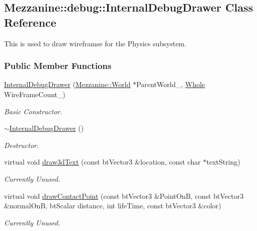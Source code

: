 \hypertarget{classMezzanine_1_1debug_1_1InternalDebugDrawer}{
\subsection{Mezzanine::debug::InternalDebugDrawer Class Reference}
\label{classMezzanine_1_1debug_1_1InternalDebugDrawer}
}


This is used to draw wireframse for the Physics subsystem.  


\subsubsection*{Public Member Functions}
\begin{DoxyCompactItemize}
\item 
\hyperlink{classMezzanine_1_1debug_1_1InternalDebugDrawer_afba37710a312f272859fecbe01b9f643}{InternalDebugDrawer} (\hyperlink{classMezzanine_1_1World}{Mezzanine::World} $\ast$ParentWorld\_\-, \hyperlink{namespaceMezzanine_adcbb6ce6d1eb4379d109e51171e2e493}{Whole} WireFrameCount\_)
\begin{DoxyCompactList}\small\item\em Basic Constructor. \item\end{DoxyCompactList}\item 
\hyperlink{classMezzanine_1_1debug_1_1InternalDebugDrawer_a93dd964d454dbc3b34e3535e6eab2822}{$\sim$InternalDebugDrawer} ()
\begin{DoxyCompactList}\small\item\em Destructor. \item\end{DoxyCompactList}\item 
virtual void \hyperlink{classMezzanine_1_1debug_1_1InternalDebugDrawer_aaec96d2b633e9890ac4d4bd28816e7b6}{draw3dText} (const btVector3 \&location, const char $\ast$textString)
\begin{DoxyCompactList}\small\item\em Currently Unused. \item\end{DoxyCompactList}\item 
virtual void \hyperlink{classMezzanine_1_1debug_1_1InternalDebugDrawer_aab7fbeabbd7ddb67d5388fdd5673c005}{drawContactPoint} (const btVector3 \&PointOnB, const btVector3 \&normalOnB, btScalar distance, int lifeTime, const btVector3 \&color)
\begin{DoxyCompactList}\small\item\em Currently Unused. \item\end{DoxyCompactList}\item 

\end{DoxyCompactItemize}
